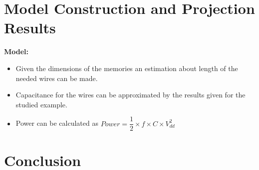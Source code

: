 \documentclass[12pt,a4paper]{article}
\begin{document}
\section{Model Construction and Projection Results}

 
\textbf{Model:}

\begin{itemize}
\item Given the dimensions of the memories an estimation about length of the needed wires can be made.
\item Capacitance for the wires can be approximated by the results given for the studied example.
\item Power can be calculated as $Power = \dfrac{1}{2} \times f \times C \times V_{dd}^{2} $
\end{itemize}

\section{Conclusion}



\end{document}
